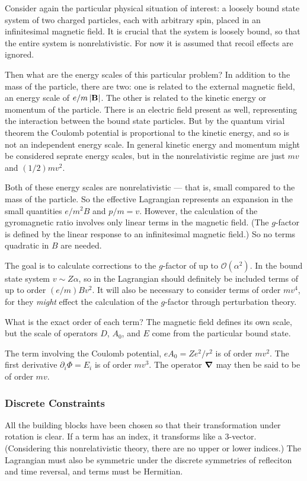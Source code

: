 Consider again the particular physical situation of interest: a loosely bound state system of two charged particles, each with arbitrary spin, placed in an infinitesimal magnetic field.  It is crucial that the system is loosely bound, so that the entire system is nonrelativistic.  For now it is assumed that recoil effects are ignored.  

Then what are the energy scales of this particular problem?  In addition to the mass of the particle, there are two: one is related to the external magnetic field, an energy scale of $ e/m \left| \mathbf{B} \right|$.  The other is related to the kinetic energy or momentum of the particle.  There is an electric field present as well, representing the interaction between the bound state particles.  But by the quantum virial theorem the Coulomb potential is proportional to the kinetic energy, and so is not an independent energy scale.  In general kinetic energy and momentum might be considered seprate energy scales, but in the nonrelativistic regime are just $mv$ and $(1/2) mv^2$.

Both of these energy scales are nonrelativistic --- that is, small compared to the mass of the particle.  So the effective Lagrangian represents an expansion in the small quantities $e/m^2 B$ and $p/m = v$.  However, the calculation of the gyromagnetic ratio involves only linear terms in the magnetic field. (The $g$-factor is defined by the linear response to an infinitesimal magnetic field.)  So no terms quadratic in $B$ are needed.

The goal is to calculate corrections to the $g$-factor of up to $\mathcal{O}(\alpha^2)$.  In the bound state system $v \sim Z\alpha$, so in the Lagrangian should definitely be included terms of up to order $(e/m) B v^2$.  It will also be necessary to consider terms of order $mv^4$, for they {\it might} effect the calculation of the $g$-factor through perturbation theory. 

What is the exact order of each term?  The magnetic field defines its own scale, but the scale of operators $D$, $A_0$, and $E$ come from the particular bound state.

The term involving the Coulomb potential, $e A_0 = Z e^2 / r^2$ is of order $mv^2$.  The first derivative $ \partial_i \Phi =E_i$ is of order $mv^3$.  The operator $\grad$ may then be said to be of order $mv$.
\subsubsection{Discrete Constraints}
All the building blocks have been chosen so that their transformation under rotation is clear.  If a term has an index, it transforms like a 3-vector.  (Considering this nonrelativistic theory, there are no upper or lower indices.)  The Lagrangian must also be symmetric under the discrete symmetries of refleciton and time reversal, and terms must be Hermitian.  


